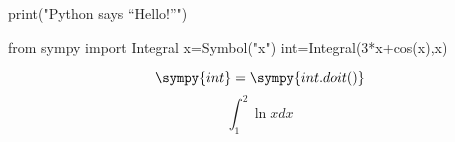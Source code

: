 \begin{pycode}
print("Python says ``Hello!''")
\end{pycode}
\begin{sympycode}
from sympy import Integral
x=Symbol("x")
int=Integral(3*x+cos(x),x)
\end{sympycode}
\[ \sympy{int}=\sympy{int.doit()} \]
\[\int_{1}^{2}{\ln{x}dx}\]
